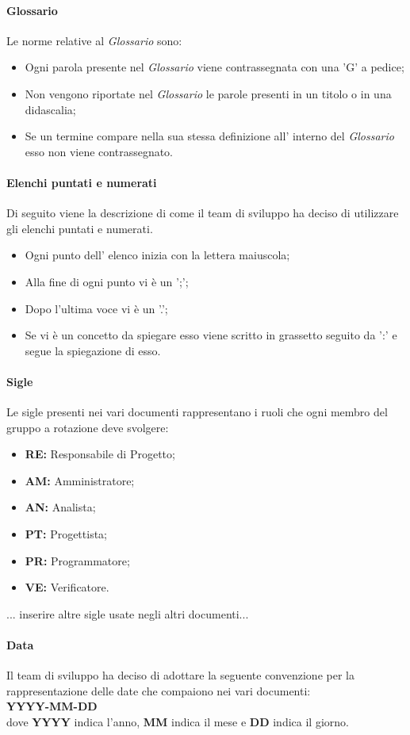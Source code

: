 \paragraph{Glossario}
Le norme relative al \textit{Glossario} sono:
\begin{itemize}
    \item Ogni parola presente nel \textit{Glossario} viene contrassegnata con una 'G' a pedice;
    \item Non vengono riportate nel \textit{Glossario} le parole presenti in un titolo o in una didascalia;
    \item Se un termine compare nella sua stessa definizione all' interno del \textit{Glossario} esso non viene contrassegnato.
\end{itemize}
\paragraph{Elenchi puntati e numerati}
Di seguito viene la descrizione di come il team di sviluppo ha deciso di utilizzare gli elenchi puntati e numerati.
\begin {itemize}
    \item Ogni punto dell' elenco inizia con la lettera maiuscola;
    \item Alla fine di ogni punto vi è un ';';
    \item Dopo l'ultima voce vi è un '.';
    \item Se vi è un concetto da spiegare esso viene scritto in grassetto seguito da ':' e segue la spiegazione di esso.
\end {itemize}
\paragraph{Sigle}
Le sigle presenti nei vari documenti rappresentano i ruoli che ogni membro del gruppo a rotazione deve svolgere:
\begin{itemize}
    \item \textbf{RE:} Responsabile di Progetto;
    \item \textbf{AM:} Amministratore;
    \item \textbf{AN:} Analista;
    \item \textbf{PT:} Progettista;
    \item \textbf{PR:} Programmatore;
    \item \textbf{VE:} Verificatore.
\end {itemize}
... inserire altre sigle usate negli altri documenti...
\paragraph{Data}
Il team di sviluppo ha deciso di adottare la seguente convenzione per la rappresentazione delle date che compaiono nei vari documenti:\\
\textbf{YYYY-MM-DD}\\
dove \textbf{YYYY} indica l'anno, \textbf{MM} indica il mese e \textbf{DD} indica il giorno.

